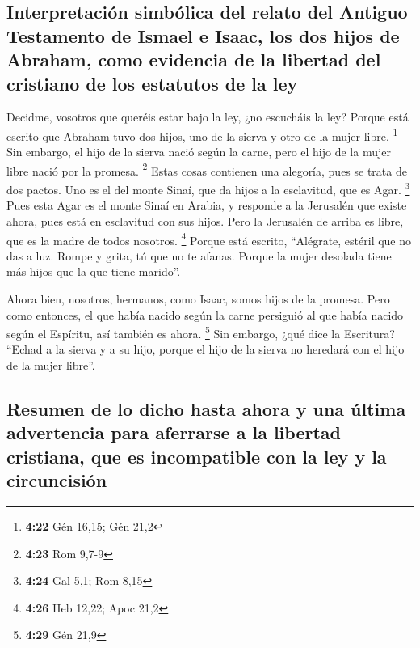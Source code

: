 \hypertarget{interpretaciuxf3n-simbuxf3lica-del-relato-del-antiguo-testamento-de-ismael-e-isaac-los-dos-hijos-de-abraham-como-evidencia-de-la-libertad-del-cristiano-de-los-estatutos-de-la-ley}{%
\subsection{Interpretación simbólica del relato del Antiguo Testamento
de Ismael e Isaac, los dos hijos de Abraham, como evidencia de la
libertad del cristiano de los estatutos de la
ley}\label{interpretaciuxf3n-simbuxf3lica-del-relato-del-antiguo-testamento-de-ismael-e-isaac-los-dos-hijos-de-abraham-como-evidencia-de-la-libertad-del-cristiano-de-los-estatutos-de-la-ley}}

 Decidme, vosotros que queréis estar bajo la ley, ¿no
escucháis la ley?  Porque está escrito que Abraham tuvo
dos hijos, uno de la sierva y otro de la mujer libre. \footnote{\textbf{4:22}
  Gén 16,15; Gén 21,2}  Sin embargo, el hijo de la sierva
nació según la carne, pero el hijo de la mujer libre nació por la
promesa. \footnote{\textbf{4:23} Rom 9,7-9}  Estas cosas
contienen una alegoría, pues se trata de dos pactos. Uno es el del monte
Sinaí, que da hijos a la esclavitud, que es Agar. \footnote{\textbf{4:24}
  Gal 5,1; Rom 8,15}  Pues esta Agar es el monte Sinaí en
Arabia, y responde a la Jerusalén que existe ahora, pues está en
esclavitud con sus hijos.  Pero la Jerusalén de arriba es
libre, que es la madre de todos nosotros. \footnote{\textbf{4:26} Heb
  12,22; Apoc 21,2}  Porque está escrito, ``Alégrate,
estéril que no das a luz. Rompe y grita, tú que no te afanas. Porque la
mujer desolada tiene más hijos que la que tiene marido''.

 Ahora bien, nosotros, hermanos, como Isaac, somos hijos
de la promesa.  Pero como entonces, el que había nacido
según la carne persiguió al que había nacido según el Espíritu, así
también es ahora. \footnote{\textbf{4:29} Gén 21,9}  Sin
embargo, ¿qué dice la Escritura? ``Echad a la sierva y a su hijo, porque
el hijo de la sierva no heredará con el hijo de la mujer libre''.

\hypertarget{resumen-de-lo-dicho-hasta-ahora-y-una-uxfaltima-advertencia-para-aferrarse-a-la-libertad-cristiana-que-es-incompatible-con-la-ley-y-la-circuncisiuxf3n}{%
\subsection{Resumen de lo dicho hasta ahora y una última advertencia
para aferrarse a la libertad cristiana, que es incompatible con la ley y
la
circuncisión}\label{resumen-de-lo-dicho-hasta-ahora-y-una-uxfaltima-advertencia-para-aferrarse-a-la-libertad-cristiana-que-es-incompatible-con-la-ley-y-la-circuncisiuxf3n}}

